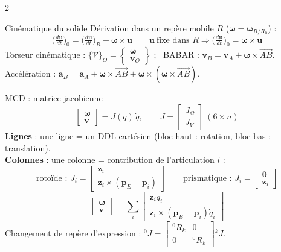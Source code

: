 \documentclass[10pt,a4paper]{article}
\newcommand{\vect}[1]{\mathbf{#1}}
\begin{document}
\begin{multicols}{2}
\begin{fbx}{Cinématique du solide}
Dérivation dans un repère mobile $R$ ($\boldsymbol\omega=\boldsymbol\omega_{R/R_0}$) :
\[\Big(\tfrac{d\vect u}{dt}\Big)_0=\Big(\tfrac{d\vect u}{dt}\Big)_R+\boldsymbol\omega\times\vect u\qquad
\vect u\ \text{fixe dans }R\Rightarrow\Big(\tfrac{d\vect u}{dt}\Big)_0=\boldsymbol\omega\times\vect u\]
Torseur cinématique : $\{\mathcal V\}_O=\left\{\begin{smallmatrix}\boldsymbol\omega\\ \vect v_O\end{smallmatrix}\right\}$ ; \ BABAR : $\vect v_B=\vect v_A+\boldsymbol\omega\times\overrightarrow{AB}$.\\
Accélération : $\vect a_B=\vect a_A+\dot{\boldsymbol\omega}\times\overrightarrow{AB}+\boldsymbol\omega\times(\boldsymbol\omega\times\overrightarrow{AB})$.
\end{fbx}

\begin{fbx}{MCD : matrice jacobienne}
\[\begin{bmatrix}\boldsymbol\omega\\\vect v\end{bmatrix}=J(q)\,\dot q,\qquad J=\begin{bmatrix}J_\Omega\\J_V\end{bmatrix}\ (6\times n)\]
\textbf{Lignes} : une ligne = un DDL cartésien (bloc haut : rotation, bloc bas : translation).\\
\textbf{Colonnes} : une colonne = contribution de l'articulation $i$ :
\[\text{rotoïde : }J_i=\begin{bmatrix}\vect z_i\\ \vect z_i\times(\vect p_E-\vect p_i)\end{bmatrix}\qquad\text{prismatique : }J_i=\begin{bmatrix}\vect 0\\\vect z_i\end{bmatrix}\]
\[\begin{bmatrix}\boldsymbol\omega\\\vect v\end{bmatrix}=\sum_i\begin{bmatrix}\vect z_i\dot q_i\\ \vect z_i\times(\vect p_E-\vect p_i)\dot q_i\end{bmatrix}\]
Changement de repère d'expression : ${}^0J=\begin{bmatrix}{}^0R_k&0\\0&{}^0R_k\end{bmatrix}{}^kJ$.
\end{fbx}


\end{multicols}
\end{document}
